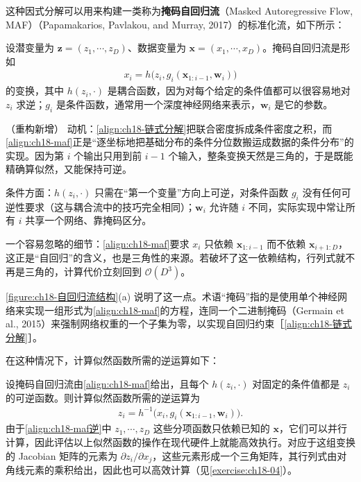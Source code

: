 \documentclass[../../main.tex]{subfiles}
\begin{document}
这种因式分解可以用来构建一类称为\textbf{掩码自回归流}（Masked Autoregressive Flow, MAF）（Papamakarios, Pavlakou, and Murray, 2017）的标准化流，如下所示：

\begin{definition}[掩码自回归流]\label{definition:ch18-掩码自回归流}
设潜变量为 $\bm{z}=(z_1,\cdots,z_D)$、数据变量为 $\bm{x}=(x_1,\cdots,x_D)$。掩码自回归流是形如
\begin{align}
  x_i=h\big(z_i,g_i(\bm{x}_{1:i-1},\bm{w}_i)\big)\label{align:ch18-maf}
\end{align}
的变换，其中 $h(z_i,\cdot)$ 是耦合函数，因为对每个给定的条件值都可以很容易地对 $z_i$ 求逆；$g_i$ 是条件函数，通常用一个深度神经网络来表示，$\bm{w}_i$ 是它的参数。
\end{definition}

\begin{remark}（重构新增）
动机：\eqref{align:ch18-链式分解}把联合密度拆成条件密度之积，而\eqref{align:ch18-maf}正是“逐坐标地把基础分布的条件分位数搬运成数据的条件分布”的实现。因为第 $i$ 个输出只用到前 $i-1$ 个输入，整条变换天然是三角的，于是既能精确算似然，又能保持可逆。

条件方面：$h(z_i,\cdot)$ 只需在“第一个变量”方向上可逆，对条件函数 $g_i$ 没有任何可逆性要求（这与耦合流中的技巧完全相同）；$\bm{w}_i$ 允许随 $i$ 不同，实际实现中常让所有 $i$ 共享一个网络、靠掩码区分。

一个容易忽略的细节：\eqref{align:ch18-maf}要求 $x_i$ 只依赖 $\bm{x}_{1:i-1}$ 而不依赖 $\bm{x}_{i+1:D}$，这正是“自回归”的含义，也是三角性的来源。若破坏了这一依赖结构，行列式就不再是三角的，计算代价立刻回到 $\mathcal{O}(D^{3})$。
\end{remark}

\cref{figure:ch18-自回归流结构}(a) 说明了这一点。术语“掩码”指的是使用单个神经网络来实现一组形式为\eqref{align:ch18-maf}的方程，连同一个二进制掩码（Germain et al., 2015）来强制网络权重的一个子集为零，以实现自回归约束［\eqref{align:ch18-链式分解}］。

在这种情况下，计算似然函数所需的逆运算如下：

\begin{proposition}\label{proposition:ch18-maf逆}
设掩码自回归流由\eqref{align:ch18-maf}给出，且每个 $h(z_i,\cdot)$ 对固定的条件值都是 $z_i$ 的可逆函数。则计算似然函数所需的逆运算为
\begin{align}
  z_i=h^{-1}\big(x_i,g_i(\bm{x}_{1:i-1},\bm{w}_i)\big).\label{align:ch18-maf逆}
\end{align}
由于\eqref{align:ch18-maf逆}中 $z_1,\cdots,z_D$ 这些分项函数只依赖已知的 $\bm{x}$，它们可以并行计算，因此评估以上似然函数的操作在现代硬件上就能高效执行。对应于这组变换的 Jacobian 矩阵的元素为 $\partial z_i/\partial x_j$，这些元素形成一个三角矩阵，其行列式由对角线元素的乘积给出，因此也可以高效计算（见\cref{exercise:ch18-04}）。
\end{proposition}
\end{document}
